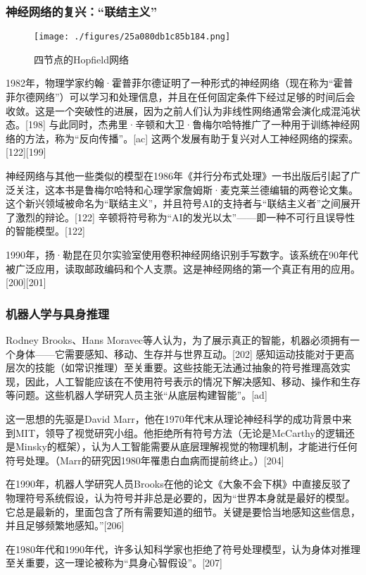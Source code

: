 \subsubsection{神经网络的复兴：“联结主义”}
\begin{figure}[ht]
\centering
\texttt{[image: ./figures/25a080db1c85b184.png]}
\caption{四节点的Hopfield网络} \label{fig_RGZN_10}
\end{figure}
1982年，物理学家约翰·霍普菲尔德证明了一种形式的神经网络（现在称为“霍普菲尔德网络”）可以学习和处理信息，并且在任何固定条件下经过足够的时间后会收敛。这是一个突破性的进展，因为之前人们认为非线性网络通常会演化成混沌状态。[198] 与此同时，杰弗里·辛顿和大卫·鲁梅尔哈特推广了一种用于训练神经网络的方法，称为“反向传播”。[ac] 这两个发展有助于复兴对人工神经网络的探索。[122][199]

神经网络与其他一些类似的模型在1986年《并行分布式处理》一书出版后引起了广泛关注，这本书是鲁梅尔哈特和心理学家詹姆斯·麦克莱兰德编辑的两卷论文集。这个新兴领域被命名为“联结主义”，并且符号AI的支持者与“联结主义者”之间展开了激烈的辩论。[122] 辛顿将符号称为“AI的发光以太”——即一种不可行且误导性的智能模型。[122]

1990年，扬·勒昆在贝尔实验室使用卷积神经网络识别手写数字。该系统在90年代被广泛应用，读取邮政编码和个人支票。这是神经网络的第一个真正有用的应用。[200][201]
\subsubsection{机器人学与具身推理}
Rodney Brooks、Hans Moravec等人认为，为了展示真正的智能，机器必须拥有一个身体——它需要感知、移动、生存并与世界互动。[202] 感知运动技能对于更高层次的技能（如常识推理）至关重要。这些技能无法通过抽象的符号推理高效实现，因此，人工智能应该在不使用符号表示的情况下解决感知、移动、操作和生存等问题。这些机器人学研究人员主张“从底层构建智能”。[ad]

这一思想的先驱是David Marr，他在1970年代末从理论神经科学的成功背景中来到MIT，领导了视觉研究小组。他拒绝所有符号方法（无论是McCarthy的逻辑还是Minsky的框架），认为人工智能需要从底层理解视觉的物理机制，才能进行任何符号处理。（Marr的研究因1980年罹患白血病而提前终止。）[204]

在1990年，机器人学研究人员Brooks在他的论文《大象不会下棋》中直接反驳了物理符号系统假设，认为符号并非总是必要的，因为“世界本身就是最好的模型。它总是最新的，里面包含了所有需要知道的细节。关键是要恰当地感知这些信息，并且足够频繁地感知。”[206]

在1980年代和1990年代，许多认知科学家也拒绝了符号处理模型，认为身体对推理至关重要，这一理论被称为“具身心智假设”。[207]
